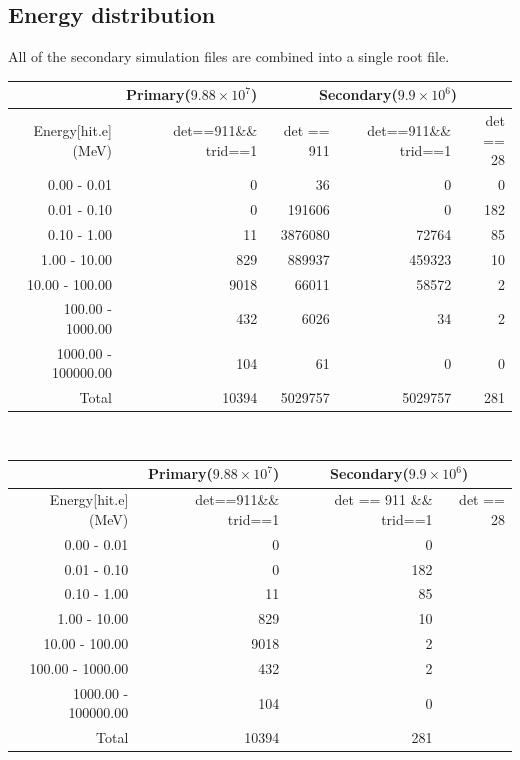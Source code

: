 \documentclass[a4paper,12pt]{article}
\begin{document}
    \subsection{Energy distribution}
    All of the secondary simulation files are combined into a single root file.
    \begin{table}[h!]
        \centering
        \begin{tabular}{r|r|rrr}
            &  Primary($9.88 \times 10^{7}$)  &  \multicolumn{3}{c}{Secondary($9.9 \times 10^{6}$)} \\
            \hline
            Energy[hit.e] (MeV) & det==911\&\& trid==1  & det == 911 & det==911\&\& trid==1  &  det == 28 \\
            \hline
            \hline
            0.00 - 0.01         &    0 &      36 &       0 &       0 \\
            0.01 - 0.10         &    0 &  191606 &       0 &     182 \\
            0.10 - 1.00         &   11 & 3876080 &   72764 &      85 \\
            1.00 - 10.00        &  829 &  889937 &  459323 &      10 \\
            10.00 - 100.00      & 9018 &   66011 &   58572 &       2 \\
            100.00 - 1000.00    &  432 &    6026 &      34 &       2 \\
            1000.00 - 100000.00 &  104 &      61 &       0 &       0 \\
            \hline
            Total               & 10394 & 5029757 & 5029757 &     281\\
             \hline
        \end{tabular} ~
    \end{table}
    \begin{table}[h!]
        \centering
        \begin{tabular}{r|r|rr}
            &  Primary($9.88 \times 10^{7}$)  &  \multicolumn{2}{c}{Secondary($9.9 \times 10^{6}$)} \\
            \hline
            Energy[hit.e] (MeV) & det==911\&\& trid==1  & det == 911 \&\& trid==1 & det == 28 \\
            \hline
            \hline
            0.00 - 0.01         &    0 &     0 \\
            0.01 - 0.10         &    0 &   182 \\
            0.10 - 1.00         &   11 &    85 \\
            1.00 - 10.00        &  829 &    10 \\
            10.00 - 100.00      & 9018 &     2 \\
            100.00 - 1000.00    &  432 &     2 \\
            1000.00 - 100000.00 &  104 &     0 \\
             \hline
             Total                & 10394     & 281 
        \end{tabular} ~
    \end{table}
    
    
\end{document}
